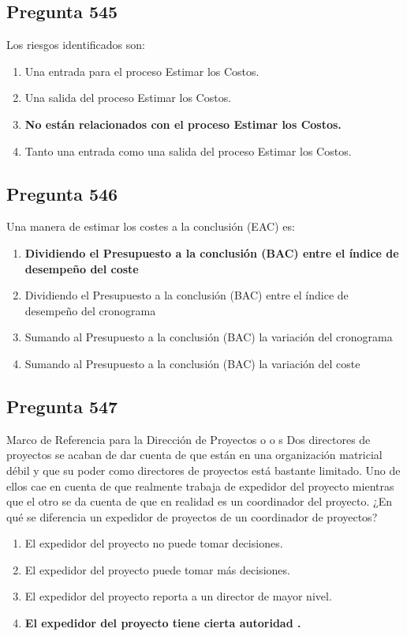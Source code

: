 \documentclass[11pt,a4paper]{article}
\begin{document}
\subsection*{Pregunta 545}
Los riesgos identificados son:

\begin{enumerate}[label=\alph*)]
  \item Una entrada para el proceso Estimar los Costos.
  \item Una salida del proceso Estimar los Costos.
  \item \textbf{No están relacionados con el proceso Estimar los Costos.}
  \item Tanto una entrada como una salida del proceso Estimar los Costos.
\end{enumerate}

\subsection*{Pregunta 546}
Una manera de estimar los costes a la conclusión (EAC) es:

\begin{enumerate}[label=\alph*)]
  \item \textbf{Dividiendo el Presupuesto a la conclusión (BAC) entre el índice de desempeño del coste}
  \item Dividiendo el Presupuesto a la conclusión (BAC) entre el índice de desempeño del cronograma
  \item Sumando al Presupuesto a la conclusión (BAC) la variación del cronograma
  \item Sumando al Presupuesto a la conclusión (BAC) la variación del coste
\end{enumerate}

\subsection*{Pregunta 547}
Marco de Referencia para la Dirección de Proyectos o o s Dos directores de proyectos se acaban de dar cuenta de que están en una organización matricial débil y que su poder como directores de proyectos está bastante limitado. Uno de ellos cae en cuenta de que realmente trabaja de expedidor del proyecto mientras que el otro se da cuenta de que en realidad es un coordinador del proyecto. ¿En qué se diferencia un expedidor de proyectos de un coordinador de proyectos?

\begin{enumerate}[label=\alph*)]
  \item El expedidor del proyecto no puede tomar decisiones.
  \item El expedidor del proyecto puede tomar más decisiones.
  \item El expedidor del proyecto reporta a un director de mayor nivel.
  \item \textbf{El expedidor del proyecto tiene cierta autoridad .}
\end{enumerate}
\end{document}
